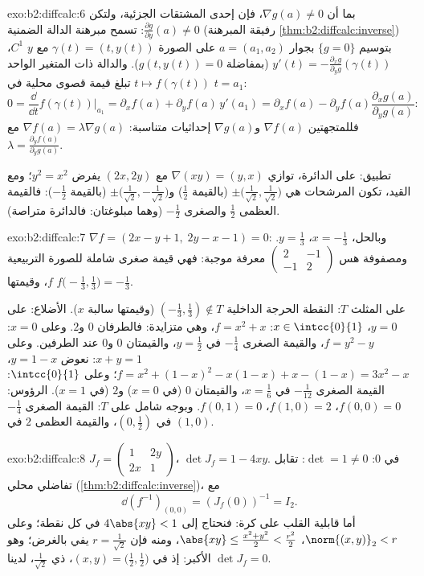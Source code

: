 \begin{solution}{exo:b2:diffcalc:6}
بما أن $\nabla g(a) \neq 0$، فإن إحدى المشتقات الجزئية، ولتكن $\frac{\partial
g}{\partial y}(a) \neq 0$: تسمح مبرهنة
الدالة الضمنية (رفيقة المبرهنة \cref{thm:b2:diffcalc:inverse}) بتوسيم $\{g =
0\}$ بجوار $a = (a_1, a_2)$ على
الصورة $\gamma(t) = (t, y(t))$ مع $y$
$C^1$، $y'(t) = -\frac{\partial_x g}{\partial_y g}(\gamma(t))$
(بمفاضلة $g(t, y(t)) = 0$). والدالة ذات المتغير الواحد $t
\mapsto f(\gamma(t))$ تبلغ قيمة قصوى
محلية في $t = a_1$:
\[
0 = \frac{\dd}{\dd t}f(\gamma(t))\Big|_{a_1}
= \partial_x f(a) + \partial_y f(a)\,y'(a_1)
= \partial_x f(a) - \partial_yf(a)\frac{\partial_x
g(a)}{\partial_y g(a)} :
\]
فللمتجهتين $\nabla f(a)$ و$\nabla g(a)$ إحداثيات متناسبة: $\nabla f(a) = \lambda \nabla g(a)$ مع $\lambda =
\frac{\partial_y f(a)}{\partial_y g(a)}$.

تطبيق: على الدائرة، توازي $\nabla(xy) = (y, x)$ مع $(2x, 2y)$ يفرض $y^2 = x^2$؛ ومع القيد،
تكون المرشحات هي $\pm\bigl(\tfrac{1}{\sqrt2}, \tfrac{1}{\sqrt2}\bigr)$ (بالقيمة $\frac12$) و$\pm\bigl(\tfrac{1}{\sqrt2},
-\tfrac{1}{\sqrt2}\bigr)$ (بالقيمة $-\frac12$):
فالقيمة العظمى $\frac12$ والصغرى $-\frac12$ (وهما مبلوغتان: فالدائرة متراصة).
\end{solution}

\begin{solution}{exo:b2:diffcalc:7}
$\nabla f = (2x - y + 1,\; 2y - x - 1) = 0$: وبالحل، $x =
-\frac13$، $y = \frac13$. ومصفوفة هس $\begin{pmatrix} 2 & -1\\ -1 &
2\end{pmatrix}$ معرفة موجبة: فهي
قيمة صغرى شاملة للصورة التربيعية $f$، وقيمتها $f\bigl(-\frac13, \frac13\bigr) = -\frac13$.

على المثلث $T$: النقطة الحرجة الداخلية $(-\frac13,
\frac13) \notin T$ (وقيمتها سالبة
$x$). الأضلاع: على $y = 0$، $x \in
\intcc{0}{1}$: $f = x^2 + x$، وهي متزايدة: فالطرفان
$0$ و$2$. وعلى
$x = 0$: $f = y^2 - y$، والقيمة الصغرى $-\frac14$ في $y = \frac12$، والقيمتان
$0$ و$0$ عند الطرفين. وعلى $x + y = 1$: نعوض $y = 1 - x$،
$f = x^2 + (1-x)^2 - x(1-x) + x - (1-x) = 3x^2 - x$؛ وعلى
$\intcc{0}{1}$: القيمة الصغرى $-\frac{1}{12}$ في $x = \frac16$، والقيمتان
$0$ (في $x=0$) و$2$ (في $x=1$). الرؤوس: $f(0,0) = 0$، $f(1,0)
= 2$، $f(0,1) = 0$.
وبوجه شامل على $T$: القيمة الصغرى $-\frac14$ في $(0,
\frac12)$، والقيمة
العظمى $2$ في $(1, 0)$.
\end{solution}

\begin{solution}{exo:b2:diffcalc:8}
$J_f = \begin{pmatrix} 1 & 2y\\ 2x & 1\end{pmatrix}$، $\det J_f =
1 - 4xy$. في $0$: $\det = 1 \neq 0$: تقابل تفاضلي محلي
(\cref{thm:b2:diffcalc:inverse})، مع
\[
\dd(f^{-1})_{(0,0)} = (J_f(0))^{-1} = I_2 .
\]
أما قابلية القلب على كرة: فنحتاج إلى $4\abs{xy} < 1$ في كل نقطة؛ وعلى
$\norm{(x,y)}_2 < r$، $\abs{xy} \leq \frac{x^2 + y^2}{2} <
\frac{r^2}{2}$، ومنه فإن $r = \frac{1}{\sqrt2}$ يفي بالغرض؛ وهو الأكبر:
إذ في $(x, y) = \bigl(\tfrac12, \tfrac12\bigr)$، ذي  $\frac{1}{\sqrt2}$، لدينا $\det J_f = 0$.
\end{solution}

